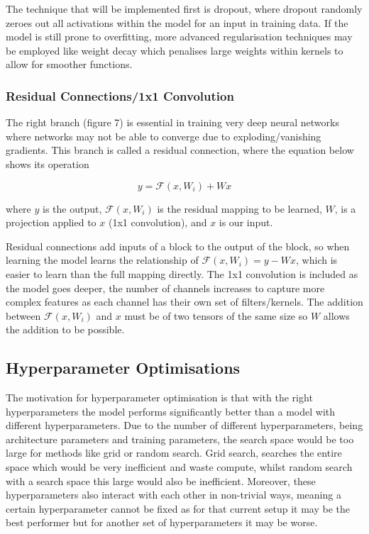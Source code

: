 The technique that will be implemented first is dropout, where dropout 
randomly zeroes out all activations within the model for an input in training data.
If the model is still prone to overfitting, more advanced regularisation techniques
may be employed like weight decay which penalises large weights within kernels to
allow for smoother functions.

\newpage
\subsubsection{Residual Connections/1x1 Convolution}
The right branch (figure 7) is essential in training very deep neural networks 
where networks may not be able to converge due to exploding/vanishing gradients. This branch
is called a residual connection, where the equation below shows its operation 

\begin{equation}
  y = \mathcal{F}(x, {W_i}) + Wx
\end{equation}

where $y$ is the output, $\mathcal{F}(x, {W_i})$ is the residual mapping to be learned,
$W$, is a projection applied to $x$ (1x1 convolution), and $x$
is our input\cite{he_2016_deep}.  

Residual connections add inputs of a block to the output of the block, so when
learning the model learns the relationship of $\mathcal{F}(x, W_i) = y - Wx$, which 
is easier to learn than the full mapping directly. The 1x1 convolution is included as
the model goes deeper, the number of channels increases to capture more complex 
features as each channel has their own set of filters/kernels. The addition between
$\mathcal{F}(x, W_i)$ and $x$ must be of two tensors of the same size so $W$ allows
the addition to be possible.

\subsection{Hyperparameter Optimisations}
The motivation for hyperparameter optimisation is that with the right hyperparameters the model performs significantly better than 
a model with different hyperparameters. Due to the number of different hyperparameters, being architecture parameters and training parameters,
the search space would be too large for methods like grid or random search. Grid search, searches the entire space which would be very 
inefficient and waste compute, whilst random search with a search space this large would also be inefficient. Moreover, these hyperparameters
also interact with each other in non-trivial ways, meaning a certain hyperparameter cannot be fixed as for that current setup it may be the 
best performer but for another set of hyperparameters it may be worse.

